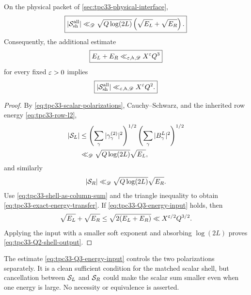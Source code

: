 \begin{theorem}
\label{thm:tpc33-column-energy-transfer}
On the physical packet of \cref{sec:tpc33-physical-interface},
\begin{equation}
 \boxed{
 |\mathcal S_{\rm sh}^{\rm all}|
 \ll_{\mathscr D}
 \sqrt{Q\log(2L)}
 \left(\sqrt{E_L}+\sqrt{E_R}\right).}
 \label{eq:tpc33-exact-energy-transfer}
\end{equation}
Consequently, the additional estimate
\begin{equation}
 \boxed{
 E_L+E_R\ll_{\varepsilon,h,\mathscr D}X^\varepsilon Q^3}
 \label{eq:tpc33-Q3-energy-input}
\end{equation}
for every fixed \(\varepsilon>0\) implies
\begin{equation}
 \boxed{
 |\mathcal S_{\rm sh}^{\rm all}|
 \ll_{\varepsilon,h,\mathscr D}X^\varepsilon Q^2.}
 \label{eq:tpc33-Q2-shell-output}
\end{equation}
\end{theorem}

\begin{proof}
By \eqref{eq:tpc33-scalar-polarizations}, Cauchy--Schwarz, and the inherited
row energy \eqref{eq:tpc33-row-l2},
\begin{align}
 |\mathcal S_L|
 &\le
 \left(\sum_\gamma|\gamma_\gamma^{(2)}|^2\right)^{1/2}
 \left(\sum_\gamma|B_\gamma^L|^2\right)^{1/2}
 \notag\\
 &\ll_{\mathscr D}\sqrt{Q\log(2L)}\sqrt{E_L},
 \label{eq:tpc33-left-CS}
\end{align}
and similarly
\begin{equation}
 |\mathcal S_R|
 \ll_{\mathscr D}\sqrt{Q\log(2L)}\sqrt{E_R}.
 \label{eq:tpc33-right-CS}
\end{equation}
Use \eqref{eq:tpc33-shell-as-column-sum} and the triangle inequality to
obtain \eqref{eq:tpc33-exact-energy-transfer}.  If
\eqref{eq:tpc33-Q3-energy-input} holds, then
\[
 \sqrt{E_L}+\sqrt{E_R}
 \le\sqrt{2(E_L+E_R)}
 \ll X^{\varepsilon/2}Q^{3/2}.
\]
Applying the input with a smaller soft exponent and absorbing
\(\log(2L)\) proves \eqref{eq:tpc33-Q2-shell-output}.
\end{proof}

\begin{remark}
The estimate \eqref{eq:tpc33-Q3-energy-input} controls the two
polarizations separately.  It is a clean sufficient condition for the
matched scalar shell, but cancellation between \(\mathcal S_L\) and \(\mathcal S_R\)
could make the scalar sum smaller even when one energy is large.  No
necessity or equivalence is asserted.
\end{remark}

